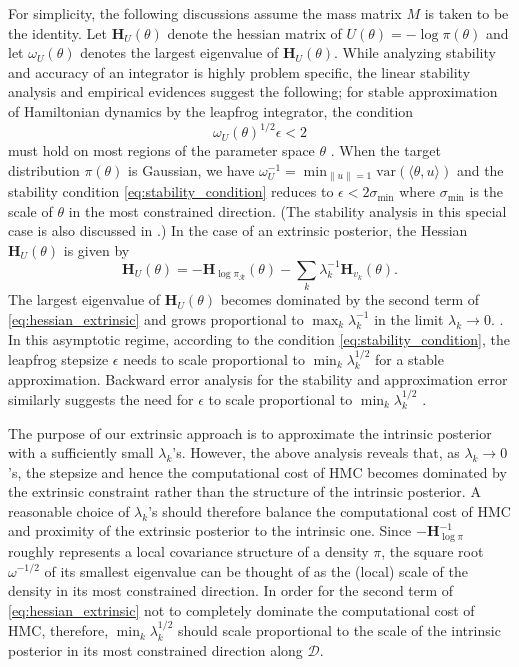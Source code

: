 \documentclass[10pt]{article}
\newcommand{\leo}[1]{{\color{blue}{Leo: #1}}}
\newcommand{\mc}[1]{\mathcal{#1}}
\DeclareMathOperator{\1}{\mathbbm{1}}
\newcommand{\dt}{\epsilon} %
\newcommand{\mass}{M} %
\newcommand{\hess}{\mathbf{H}} %
\begin{document}
For simplicity, the following discussions assume the mass matrix $\mass$ is taken to be the identity. Let $\hess_U(\theta)$ denote the hessian matrix of $U(\theta) = - \log \pi(\theta)$ and let $\omega_U(\theta)$ denotes the largest eigenvalue of $\hess_U(\theta)$. While analyzing stability and accuracy of an integrator is highly problem specific, the linear stability analysis and empirical evidences suggest the following; for stable approximation of Hamiltonian dynamics by the leapfrog integrator, the condition 
\begin{equation}
\label{eq:stability_condition}
\omega_U(\theta)^{1/2} \dt < 2
\end{equation} 
must hold on most regions of the parameter space $\theta$ \citep{hairer06}. When the target distribution $\pi(\theta)$ is Gaussian, we have $\omega_U^{-1} = \min_{\| u \| = 1} \textrm{var}(\langle \theta, u \rangle)$ and the stability condition \eqref{eq:stability_condition} reduces to $\epsilon < 2 \sigma_{\min}$ where $\sigma_{\min}$ is the scale of $\theta$ in the most constrained direction. (The stability analysis in this special case is also discussed in \cite{neal2011mcmc}.) In the case of an extrinsic posterior, the Hessian $\hess_U(\theta)$ is given by
\begin{equation}
\label{eq:hessian_extrinsic}
\hess_U(\theta) = -\hess_{\log \pi_{\mc R}}(\theta)  - \sum_k \lambda_k^{-1} \hess_{v_k}(\theta).
\end{equation}
The largest eigenvalue of $\hess_U(\theta)$ becomes dominated by the second term of \eqref{eq:hessian_extrinsic} and grows proportional to $\max_k \lambda_k^{-1}$ in the limit $\lambda_k \to 0$. \leo{we should add that this only applies when $\theta \not \in \mc D$}. In this asymptotic regime, according to the condition \eqref{eq:stability_condition}, the leapfrog stepsize $\dt$ needs to scale proportional to $\min_k \lambda_k^{1/2}$ for a stable approximation. Backward error analysis for the stability and approximation error similarly suggests the need for $\dt$ to scale proportional to $\min_k \lambda_k^{1/2}$ \citep{skeel2001modified}.

The purpose of our extrinsic approach is to approximate the intrinsic posterior with a sufficiently small $\lambda_k$'s. However, the above analysis reveals that, as $\lambda_k \to 0$'s, the stepsize and hence the computational cost of HMC becomes dominated by the extrinsic constraint rather than the structure of the intrinsic posterior. A reasonable choice of $\lambda_k$'s should therefore balance the computational cost of HMC and  proximity of the extrinsic posterior to the intrinsic one. Since $- \hess_{\log \pi}^{-1}$ roughly represents a local covariance structure of a density $\pi$, the square root $\omega^{-1 / 2}$ of its smallest eigenvalue can be thought of as the (local) scale of the density in its most constrained direction. In order for the second term of \eqref{eq:hessian_extrinsic} not to completely dominate the computational cost of HMC, therefore, $\min_k \lambda_k^{1/2}$ should scale proportional to the scale of the intrinsic posterior in its most constrained direction along $\mc D$.
\end{document}

